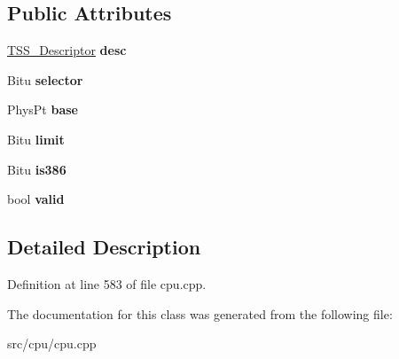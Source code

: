\subsection*{Public Attributes}
\begin{DoxyCompactItemize}
\item 
\hypertarget{classTaskStateSegment_a46267346746acbf867d029fd39f902e3}{\hyperlink{classTSS__Descriptor}{T\-S\-S\-\_\-\-Descriptor} {\bfseries desc}}\label{classTaskStateSegment_a46267346746acbf867d029fd39f902e3}

\item 
\hypertarget{classTaskStateSegment_a0875f365d4c5477c70ed057924991bd5}{Bitu {\bfseries selector}}\label{classTaskStateSegment_a0875f365d4c5477c70ed057924991bd5}

\item 
\hypertarget{classTaskStateSegment_a95148a6c625f7821ad346627e7fe7829}{Phys\-Pt {\bfseries base}}\label{classTaskStateSegment_a95148a6c625f7821ad346627e7fe7829}

\item 
\hypertarget{classTaskStateSegment_a4dce1fe9bc4bd459bd908140219759f6}{Bitu {\bfseries limit}}\label{classTaskStateSegment_a4dce1fe9bc4bd459bd908140219759f6}

\item 
\hypertarget{classTaskStateSegment_ab002072334f2f1b417358b87e03a01e7}{Bitu {\bfseries is386}}\label{classTaskStateSegment_ab002072334f2f1b417358b87e03a01e7}

\item 
\hypertarget{classTaskStateSegment_a952e7e2635dd1b3074779a0498d74775}{bool {\bfseries valid}}\label{classTaskStateSegment_a952e7e2635dd1b3074779a0498d74775}

\end{DoxyCompactItemize}


\subsection{Detailed Description}


Definition at line 583 of file cpu.\-cpp.



The documentation for this class was generated from the following file\-:\begin{DoxyCompactItemize}
\item 
src/cpu/cpu.\-cpp\end{DoxyCompactItemize}
